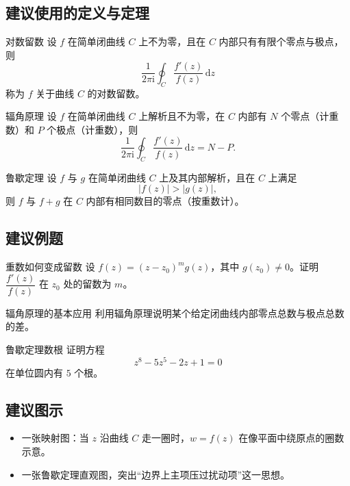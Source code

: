 \subsection*{建议使用的定义与定理}
\begin{dingliyi}{对数留数}{}
设 $f$ 在简单闭曲线 $C$ 上不为零，且在 $C$ 内部只有有限个零点与极点，则
\[
    \frac{1}{2\pi \mathrm{i}}\oint_C \frac{f'(z)}{f(z)}\,\mathrm{d}z
\]
称为 $f$ 关于曲线 $C$ 的对数留数。
\end{dingliyi}

\begin{dingli}{辐角原理}{}
设 $f$ 在简单闭曲线 $C$ 上解析且不为零，在 $C$ 内部有 $N$ 个零点（计重数）和 $P$ 个极点（计重数），则
\[
    \frac{1}{2\pi \mathrm{i}}\oint_C \frac{f'(z)}{f(z)}\,\mathrm{d}z
    =
    N-P.
\]
\end{dingli}

\begin{dingli}{鲁歇定理}{}
设 $f$ 与 $g$ 在简单闭曲线 $C$ 上及其内部解析，且在 $C$ 上满足
\[
    |f(z)|>|g(z)|,
\]
则 $f$ 与 $f+g$ 在 $C$ 内部有相同数目的零点（按重数计）。
\end{dingli}

\subsection*{建议例题}
\begin{lizi}{重数如何变成留数}{}
设 $f(z)=(z-z_0)^m g(z)$，其中 $g(z_0)\neq 0$。证明 $\dfrac{f'(z)}{f(z)}$ 在 $z_0$ 处的留数为 $m$。
\end{lizi}

\begin{lizi}{辐角原理的基本应用}{}
利用辐角原理说明某个给定闭曲线内部零点总数与极点总数的差。
\end{lizi}

\begin{lizi}{鲁歇定理数根}{}
证明方程
\[
    z^8-5z^5-2z+1=0
\]
在单位圆内有 $5$ 个根。
\end{lizi}

\subsection*{建议图示}
\begin{itemize}
    \item 一张映射图：当 $z$ 沿曲线 $C$ 走一圈时，$w=f(z)$ 在像平面中绕原点的圈数示意。
    \item 一张鲁歇定理直观图，突出``边界上主项压过扰动项''这一思想。
\end{itemize}


